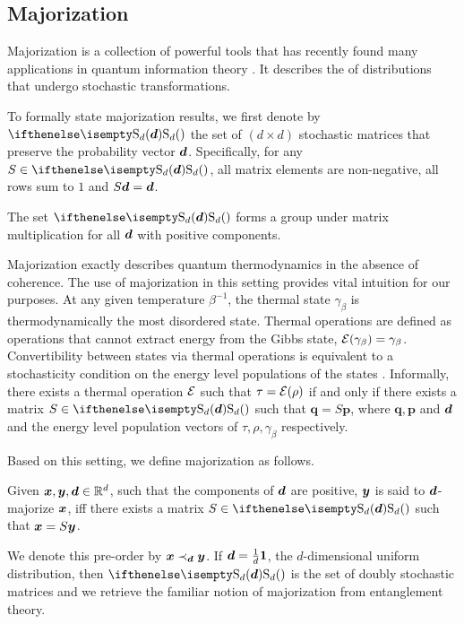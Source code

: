 \documentclass[pra,
aps,
twocolumn,
superscriptaddress,
groupedaddress,
nofootinbib,
reprint
]{revtex4-1}
\begin{document}
\subsection{Majorization}
\label{sec:major}

Majorization is a collection of powerful tools that has recently found many applications in quantum information theory .
It describes the  of distributions that undergo stochastic transformations.

To formally state majorization results, we first denote by $\stoch$ the set of $(d \times d)$ stochastic matrices that preserve the probability vector $\bm{d}$.
Specifically, for any $S \in \stoch$, all matrix elements are non-negative, all rows sum to $1$ and $S\bm{d} = \bm{d}$.

The set $\stoch$ forms a group under matrix multiplication for all $\bm{d}$ with positive components.

Majorization exactly describes quantum thermodynamics in the absence of coherence.
The use of majorization in this setting provides vital intuition for our purposes.
At any given temperature $\beta^{-1}$, the thermal state $\gamma_\beta$ is thermodynamically the most disordered state. 
Thermal operations are defined as operations that cannot extract energy from the Gibbs state, $\mathcal{E}(\gamma_\beta) = \gamma_\beta$.
Convertibility between states via thermal operations is equivalent to a stochasticity condition on the energy level populations of the states .
Informally, there exists a thermal operation $\mathcal{E}$ such that $\tau = \mathcal{E}(\rho)$ if and only if there exists a matrix $S \in \stoch$ such that $\bm{q} = S\bm{p}$, where $\bm{q}, \bm{p}$ and $\bm{d}$ and the energy level population vectors of $\tau, \rho, \gamma_\beta$ respectively.

Based on this setting, we define majorization as follows.
\begin{definition}\label{def:dmajor}
    Given $\bm{x}, \bm{y}, \bm{d} \in \mathbb{R}^d$, such that the components of $\bm{d}$ are positive, $\bm{y}$ is said to $\bm{d}$-majorize $\bm{x}$, iff there exists a matrix $S \in \stoch$ such that $\bm{x} = S\bm{y}$.
\end{definition}
We denote this pre-order by $\bm{x} \prec_{\bm{d}} \bm{y}$.
If $\bm{d} = \frac{1}{d}\bm{1}$, the $d$-dimensional uniform distribution, then $\stoch$ is the set of doubly stochastic matrices and we retrieve the familiar notion of majorization from entanglement theory. 
\end{document}
